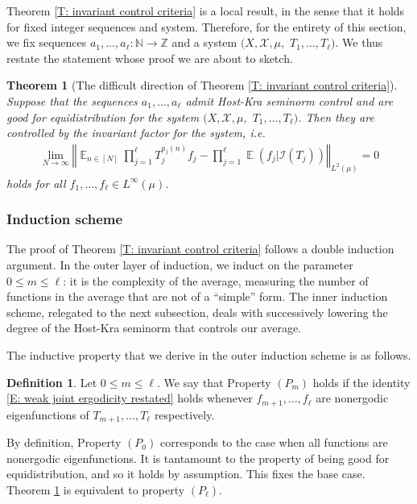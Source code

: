 \documentclass[11pt]{amsart}
\newtheorem{theorem}[lemma]{Theorem}
\theoremstyle{definition}
\newtheorem{definition}[lemma]{Definition}
\DeclareMathOperator*{\E}{\mathbb{E}}
\newcommand{\N}{{\mathbb N}}
\newcommand{\Z}{{\mathbb Z}}
\newcommand{\CE}{{\mathcal E}}
\newcommand{\CI}{{\mathcal I}}
\newcommand{\CX}{{\mathcal X}}
\newcommand{\norm}[1]{\left\Vert #1\right\Vert}
\newcommand{\1}{{\mathbf{1}}}
\begin{document}
Theorem \ref{T: invariant control criteria} is a local result, in the sense that it holds for fixed integer sequences and system. Therefore, for the entirety of this section, we fix sequences $a_1,\ldots,a_\ell\colon \N\to \Z$ and a system $(X, \CX, \mu,$\! $T_1, \ldots, T_\ell)$. We thus restate the statement whose proof we are about to sketch.
\begin{theorem}[The difficult direction of Theorem \ref{T: invariant control criteria}]\label{T: degree lowering}
        Suppose that the sequences $a_1,\ldots,a_\ell$ admit Host-Kra seminorm control and are good for equidistribution for the system $(X, \CX, \mu,$\! $T_1, \ldots, T_\ell)$. Then they are controlled by the invariant factor for the system, i.e.     \begin{align}\label{E: weak joint ergodicity restated}
        \lim_{N\to\infty}\norm{\E_{n\in[N]}\prod_{j=1}^\ell T_j^{{a_{j}(n)}}f_j - \prod_{j=1}^\ell \E(f_j|\CI(T_j))}_{L^2(\mu)} = 0
    \end{align}
    holds for all $f_1, \ldots, f_\ell\in L^\infty(\mu)$.
\end{theorem}

\subsubsection{Induction scheme}
The proof of Theorem \ref{T: invariant control criteria} follows a double induction argument. In the outer layer of induction, we induct on the parameter $0\leq m \leq \ell$: it is the complexity of the average, measuring the number of functions in the average that are not of a ``simple'' form. The inner induction scheme, relegated to the next subsection, deals with successively lowering the degree of the Host-Kra seminorm that controls our average.

The inductive property that we derive in the outer induction scheme is as follows. 
\begin{definition}\label{D: P_m}
    Let $0\leq m\leq \ell$. We say that Property $(P_m)$ holds if the identity \eqref{E: weak joint ergodicity restated} holds whenever $f_{m+1}, \ldots, f_\ell$ are nonergodic eigenfunctions of $T_{m+1}, \ldots, T_\ell$ respectively.
\end{definition}
By definition, Property $(P_0)$ corresponds to the case when all functions are nonergodic eigenfunctions. It is tantamount to the property of being good for equidistribution, and so it holds by assumption. This fixes the base case. Theorem \ref{T: degree lowering} is equivalent to property $(P_\ell)$. 
\end{document}
